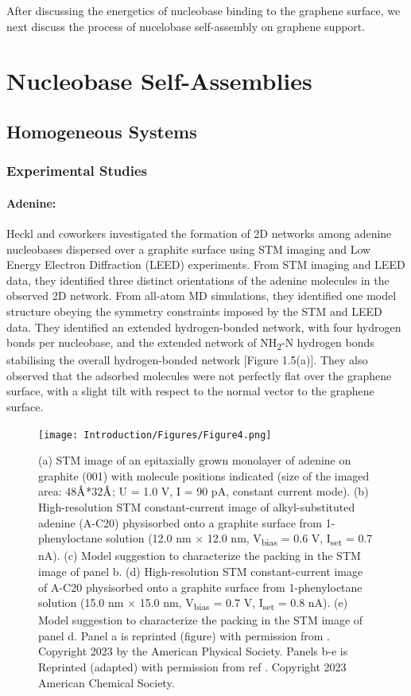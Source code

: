 After discussing the energetics of nucleobase binding to the graphene surface, we next discuss the process of nucelobase self-assembly on graphene support.

\section{Nucleobase Self-Assemblies}
\subsection{Homogeneous Systems}
\subsubsection{Experimental Studies}
\paragraph{Adenine:} 
Heckl and coworkers investigated the formation of 2D networks among adenine nucleobases dispersed over a graphite surface using STM imaging and Low Energy Electron Diffraction (LEED) experiments.\supercite{freund_structure_1997} From STM imaging and LEED data, they identified three distinct orientations of the adenine molecules in the observed 2D network. From all-atom MD simulations, they identified one model structure obeying the symmetry constraints imposed by the STM and LEED data. They identified an extended hydrogen-bonded network, with four hydrogen bonds per nucleobase, and the extended network of NH\textsubscript{2}-N hydrogen bonds stabilising the overall hydrogen-bonded network [Figure 1.5(a)]. They also observed that the adsorbed molecules were not perfectly flat over the graphene surface, with a slight tilt with respect to the normal vector to the graphene surface.

\begin{figure}
    \centering
    \texttt{[image: Introduction/Figures/Figure4.png]}
    \caption[Representative structures for adenine self-assemblies over graphene]{(a) STM image of an epitaxially grown monolayer of adenine on graphite (001) with molecule positions indicated (size of the imaged area: 48$\text{\normalfont\AA}$*32$\text{\normalfont\AA}$; U = 1.0 V, I = 90 pA, constant current mode). (b) High-resolution STM constant-current image of alkyl-substituted adenine (A-C20) physisorbed onto a graphite surface from 1-phenyloctane solution (12.0 nm × 12.0 nm, V\textsubscript{bias} = 0.6 V, I\textsubscript{set} = 0.7 nA). (c) Model suggestion to characterize the packing in the STM image of panel b. (d) High-resolution STM constant-current image of A-C20 physisorbed onto a graphite surface from 1-phenyloctane solution (15.0 nm × 15.0 nm, V\textsubscript{bias} = 0.7 V, I\textsubscript{set} = 0.8 nA). (e) Model suggestion to characterize the packing in the STM image of panel d. Panel a is reprinted (figure) with permission from \supercite{freund_structure_1997}. Copyright 2023 by the American Physical Society. Panels b-e is Reprinted (adapted) with permission from ref \supercite{mu_temperature-dependent_2013}. Copyright 2023 American Chemical Society. }
    \label{fig:figure5}
\end{figure}

